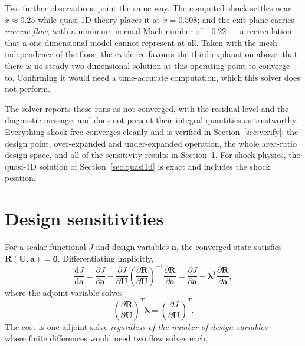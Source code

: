\documentclass[11pt,a4paper]{article}
\newcommand{\vect}[1]{\boldsymbol{#1}}
\newcommand{\Uvec}{\vect{U}}
\newcommand{\avec}{\vect{a}}
\begin{document}
Two further observations point the same way.  The computed shock settles near
$x \approx 0.25$ while quasi-1D theory places it at $x = 0.508$; and the exit
plane carries \emph{reverse flow}, with a minimum normal Mach number of $-0.22$
--- a recirculation that a one-dimensional model cannot represent at all.  Taken
with the mesh independence of the floor, the evidence favours the third
explanation above: that there is no steady two-dimensional solution at this
operating point to converge to.  Confirming it would need a time-accurate
computation, which this solver does not perform.

The solver reports these runs as not converged, with the residual level and the
diagnostic message, and does not present their integral quantities as
trustworthy.  Everything shock-free converges cleanly and is verified in
Section~\ref{sec:verify}: the design point, over-expanded and under-expanded
operation, the whole area-ratio design space, and all of the sensitivity results
in Section~\ref{sec:adjoint}.  For shock physics, the quasi-1D solution of
Section~\ref{sec:quasi1d} is exact and includes the shock position.

\section{Design sensitivities}
\label{sec:adjoint}

For a scalar functional $J$ and design variables $\avec$, the converged state
satisfies $\vect{R}(\Uvec, \avec) = \vect{0}$.  Differentiating implicitly,
\begin{equation}
  \frac{\mathrm{d}J}{\mathrm{d}\avec}
  = \frac{\partial J}{\partial \avec}
    - \frac{\partial J}{\partial \Uvec}
      \left(\frac{\partial \vect{R}}{\partial \Uvec}\right)^{-1}
      \frac{\partial \vect{R}}{\partial \avec}
  = \frac{\partial J}{\partial \avec}
    - \vect{\lambda}^{T}\frac{\partial \vect{R}}{\partial \avec},
  \label{eq:adjoint}
\end{equation}
where the adjoint variable solves
\begin{equation}
  \left(\frac{\partial \vect{R}}{\partial \Uvec}\right)^{T} \vect{\lambda}
  = \left(\frac{\partial J}{\partial \Uvec}\right)^{T}.
  \label{eq:adjointsystem}
\end{equation}
The cost is one adjoint solve \emph{regardless of the number of design
variables} --- where finite differences would need two flow solves each.
\end{document}
